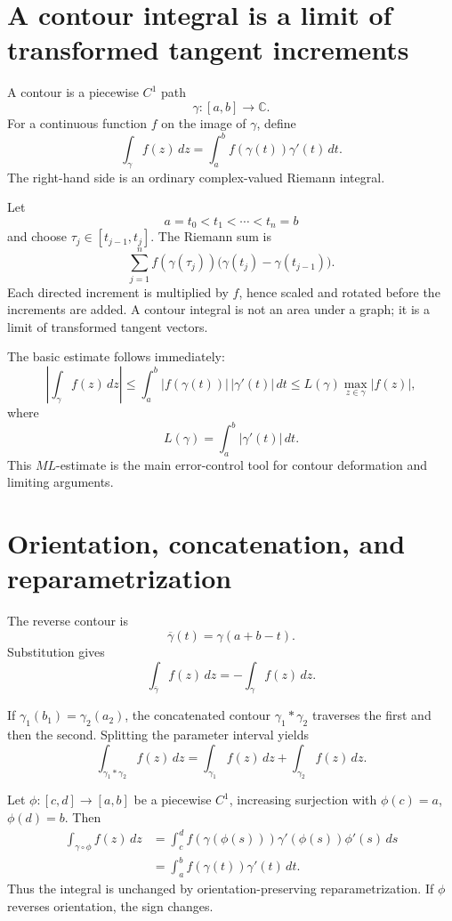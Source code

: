 
\section{A contour integral is a limit of transformed tangent increments}

A contour is a piecewise \(C^1\) path
\[
  \gamma:[a,b]\to\mathbb C.
\]
For a continuous function \(f\) on the image of \(\gamma\), define
\[
  \int_\gamma f(z)\,dz
  =\int_a^b f(\gamma(t))\gamma'(t)\,dt.
\]
The right-hand side is an ordinary complex-valued Riemann integral.

Let
\[
  a=t_0<t_1<\cdots<t_n=b
\]
and choose \(\tau_j\in[t_{j-1},t_j]\).  The Riemann sum is
\[
  \sum_{j=1}^n
  f(\gamma(\tau_j))
  \bigl(\gamma(t_j)-\gamma(t_{j-1})\bigr).
\]
Each directed increment is multiplied by \(f\), hence scaled and rotated before the increments are added.  A contour integral is not an area under a graph; it is a limit of transformed tangent vectors.

The basic estimate follows immediately:
\[
  \left|\int_\gamma f(z)\,dz\right|
  \le
  \int_a^b|f(\gamma(t))|\,|\gamma'(t)|\,dt
  \le
  L(\gamma)\max_{z\in\gamma}|f(z)|,
\]
where
\[
  L(\gamma)=\int_a^b|\gamma'(t)|\,dt.
\]
This \(ML\)-estimate is the main error-control tool for contour deformation and limiting arguments.

\section{Orientation, concatenation, and reparametrization}

The reverse contour is
\[
  \overline\gamma(t)=\gamma(a+b-t).
\]
Substitution gives
\[
  \boxed{
  \int_{\overline\gamma}f(z)\,dz
  =-\int_\gamma f(z)\,dz.}
\]

If \(\gamma_1(b_1)=\gamma_2(a_2)\), the concatenated contour \(\gamma_1*\gamma_2\) traverses the first and then the second.  Splitting the parameter interval yields
\[
  \boxed{
  \int_{\gamma_1*\gamma_2}f(z)\,dz
  =\int_{\gamma_1}f(z)\,dz
  +\int_{\gamma_2}f(z)\,dz.}
\]

Let \(\phi:[c,d]\to[a,b]\) be a piecewise \(C^1\), increasing surjection with \(\phi(c)=a\), \(\phi(d)=b\).  Then
\[
\begin{aligned}
  \int_{\gamma\circ\phi}f(z)\,dz
  &=\int_c^d
  f(\gamma(\phi(s)))
  \gamma'(\phi(s))\phi'(s)\,ds\\
  &=\int_a^b f(\gamma(t))\gamma'(t)\,dt.
\end{aligned}
\]
Thus the integral is unchanged by orientation-preserving reparametrization.  If \(\phi\) reverses orientation, the sign changes.


